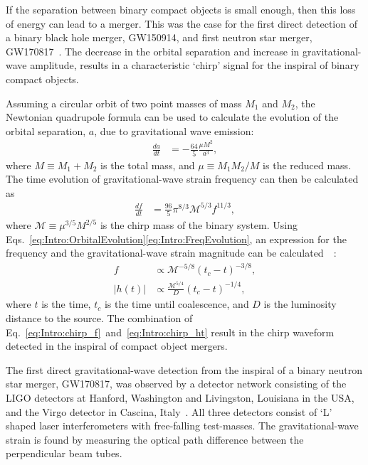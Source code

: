 \documentclass[../Thesis.tex]{subfiles}
\begin{document}
    If the separation between binary compact objects is small enough, then this loss of energy can lead to a merger.
    This was the case for the first direct detection of a binary black hole merger, GW150914, and first neutron star merger, GW170817~\cite{GW150914Detection,GW170817Detection}. 
    The decrease in the orbital separation and increase in gravitational-wave amplitude, results in a characteristic `chirp' signal for the inspiral of binary compact objects.
    
    Assuming a circular orbit of two point masses of mass $M_1$ and $M_2$, the Newtonian quadrupole formula can be used to calculate the evolution of the orbital separation, $a$, due to gravitational wave emission:~\cite[e.g.,][]{Cutler1994}
    \begin{align}
        \frac{da}{dt} & = -\frac{64}{5}\frac{\mu M^2}{a^3}, \label{eq:Intro:OrbitalEvolution}        
    \end{align}
    where  $M \equiv M_1 + M_2$ is the total mass, and $\mu \equiv M_1 M_2 / M$ is the reduced mass.
    The time evolution of gravitational-wave strain frequency can then be calculated as
    \begin{align}
        \frac{df}{dt} & = \frac{96}{5}\pi^{8/3}\mathcal{M}^{5/3}f^{11/3}, \label{eq:Intro:FreqEvolution}        
    \end{align}   
    where $\mathcal{M} \equiv \mu^{3/5} M^{2/5}$ is the chirp mass of the binary system. 
    Using Eqs.~\ref{eq:Intro:OrbitalEvolution}\Hyphdash*\ref{eq:Intro:FreqEvolution}, an expression for the frequency and the gravitational-wave strain magnitude can be calculated~~\cite[e.g.,][]{Cutler1994}: 
      \begin{align}
      f &  \propto \mathcal{M}^{- 5/8}(t_c-t)^{- 3/8},\label{eq:Intro:chirp_f}\\
        |h(t)| & \propto  \frac{\mathcal{M}^{5/4}}{D}(t_c-t)^{-1/4}, \label{eq:Intro:chirp_ht} 
    \end{align}
    where $t$ is the time, $t_c$ is the time until coalescence, and $D$ is the luminosity distance to the source. 
    The combination of Eq.~\ref{eq:Intro:chirp_f}~and~\ref{eq:Intro:chirp_ht} result in the chirp waveform detected in the inspiral of compact object mergers.
    \par
    The first direct gravitational-wave detection from the inspiral of a binary neutron star merger, GW170817, was observed by a detector network consisting of the LIGO detectors at Hanford, Washington and Livingston, Louisiana in the USA, and the Virgo detector in Cascina, Italy~\cite{AdvancedLIGO2015,AdvancedVirgo2015,GW170817Detection}. 
    All three detectors consist of `L' shaped laser interferometers with free-falling test-masses.
    The gravitational-wave strain is found by measuring the optical path difference between the perpendicular beam tubes. \par
    
\end{document}
